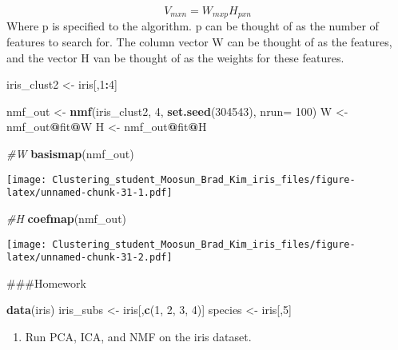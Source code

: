 \documentclass[11pt,]{article}
\newenvironment{Shaded}{\begin{snugshade}}{\end{snugshade}}
\newcommand{\CommentTok}[1]{\textcolor[rgb]{0.56,0.35,0.01}{\textit{#1}}}
\newcommand{\DataTypeTok}[1]{\textcolor[rgb]{0.13,0.29,0.53}{#1}}
\newcommand{\DecValTok}[1]{\textcolor[rgb]{0.00,0.00,0.81}{#1}}
\newcommand{\KeywordTok}[1]{\textcolor[rgb]{0.13,0.29,0.53}{\textbf{#1}}}
\newcommand{\NormalTok}[1]{#1}
\newcommand{\OperatorTok}[1]{\textcolor[rgb]{0.81,0.36,0.00}{\textbf{#1}}}
\newcommand{\StringTok}[1]{\textcolor[rgb]{0.31,0.60,0.02}{#1}}
\providecommand{\tightlist}{%
  \setlength{\itemsep}{0pt}\setlength{\parskip}{0pt}}
\begin{document}
\[V_{mxn}=W_{mxp}H_{pxn}\] Where p is specified to the algorithm. p can
be thought of as the number of features to search for. The column vector
W can be thought of as the features, and the vector H van be thought of
as the weights for these features.

\begin{Shaded}
\begin{Highlighting}[]
\NormalTok{iris_clust2 <-}\StringTok{ }\NormalTok{iris[,}\DecValTok{1}\OperatorTok{:}\DecValTok{4}\NormalTok{]}

\NormalTok{nmf_out <-}\StringTok{ }\KeywordTok{nmf}\NormalTok{(iris_clust2, }\DecValTok{4}\NormalTok{, }\KeywordTok{set.seed}\NormalTok{(}\DecValTok{304543}\NormalTok{), }\DataTypeTok{nrun=} \DecValTok{100}\NormalTok{)}
\NormalTok{W <-}\StringTok{ }\NormalTok{nmf_out}\OperatorTok{@}\NormalTok{fit}\OperatorTok{@}\NormalTok{W}
\NormalTok{H <-}\StringTok{ }\NormalTok{nmf_out}\OperatorTok{@}\NormalTok{fit}\OperatorTok{@}\NormalTok{H}

\CommentTok{#W}
\KeywordTok{basismap}\NormalTok{(nmf_out)}
\end{Highlighting}
\end{Shaded}

\texttt{[image: Clustering\_student\_Moosun\_Brad\_Kim\_iris\_files/figure-latex/unnamed-chunk-31-1.pdf]}

\begin{Shaded}
\begin{Highlighting}[]
\CommentTok{#H}
\KeywordTok{coefmap}\NormalTok{(nmf_out)}
\end{Highlighting}
\end{Shaded}

\texttt{[image: Clustering\_student\_Moosun\_Brad\_Kim\_iris\_files/figure-latex/unnamed-chunk-31-2.pdf]}
\newpage

\#\#\#Homework

\begin{Shaded}
\begin{Highlighting}[]
\KeywordTok{data}\NormalTok{(iris)}
\NormalTok{iris_subs <-}\StringTok{ }\NormalTok{iris[,}\KeywordTok{c}\NormalTok{(}\DecValTok{1}\NormalTok{, }\DecValTok{2}\NormalTok{, }\DecValTok{3}\NormalTok{, }\DecValTok{4}\NormalTok{)]}
\NormalTok{species <-}\StringTok{ }\NormalTok{iris[,}\DecValTok{5}\NormalTok{]}
\end{Highlighting}
\end{Shaded}

\begin{enumerate}
\def\labelenumi{\arabic{enumi}.}
\tightlist
\item
  Run PCA, ICA, and NMF on the iris dataset.
\end{enumerate}
\end{document}
